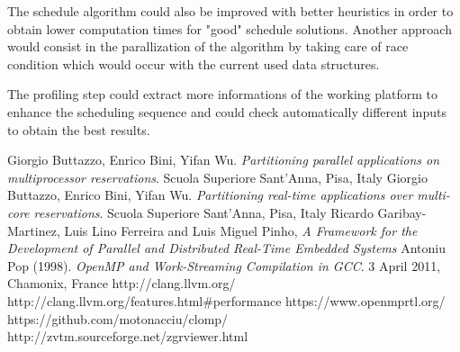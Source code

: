 \documentclass[a4paper,11pt,oneside]{book}
\begin{document}
The schedule algorithm could also be improved with better heuristics in order to obtain lower computation times for "good" schedule solutions. Another approach would consist in the parallization of the algorithm by taking care of race condition which would occur with the current used data structures.

The profiling step could extract more informations of the working platform to enhance the scheduling sequence and could check automatically different inputs to obtain the best results.

\begin{thebibliography}{9}
 Giorgio Buttazzo, Enrico Bini, Yifan Wu. \emph{Partitioning parallel applications on multiprocessor reservations}. Scuola Superiore Sant’Anna, Pisa, Italy
 Giorgio Buttazzo, Enrico Bini, Yifan Wu. \emph{Partitioning real-time applications over multi-core reservations}. Scuola Superiore Sant’Anna, Pisa, Italy
 Ricardo Garibay-Martinez, Luis Lino Ferreira and Luis Miguel Pinho, \emph{A Framework for the Development of Parallel and Distributed Real-Time Embedded Systems}
Antoniu Pop (1998). \emph{OpenMP and Work-Streaming Compilation in GCC}. 3 April 2011, Chamonix, France
http://clang.llvm.org/
http://clang.llvm.org/features.html\#performance
https://www.openmprtl.org/
https://github.com/motonacciu/clomp/
http://zvtm.sourceforge.net/zgrviewer.html


\end{thebibliography}
\end{document}
